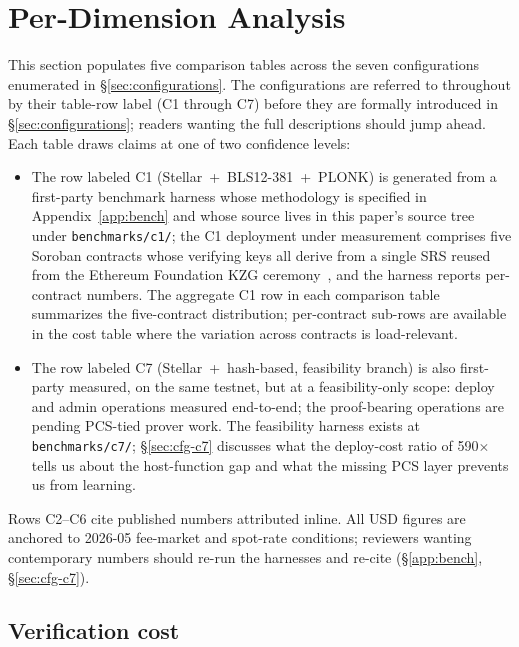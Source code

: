 \section{Per-Dimension Analysis}
\label{sec:analysis}

This section populates five comparison tables across the seven
configurations enumerated in \S\ref{sec:configurations}. The
configurations are referred to throughout by their table-row label
(C1 through C7) before they are formally introduced in
\S\ref{sec:configurations}; readers wanting the full descriptions
should jump ahead. Each table draws claims at one of two confidence
levels:

\begin{itemize}
  \item The row labeled C1 (Stellar~+~BLS12-381~+~PLONK) is
    generated from a first-party benchmark harness whose methodology
    is specified in Appendix~\ref{app:bench} and whose source lives
    in this paper's source tree under \texttt{benchmarks/c1/}; the
    C1 deployment under measurement comprises five Soroban contracts
    whose verifying keys all derive from a single SRS reused from
    the Ethereum Foundation KZG
    ceremony~\cite{eth-kzg-ceremony}, and the harness reports
    per-contract numbers. The aggregate C1 row in each comparison
    table summarizes the five-contract distribution; per-contract
    sub-rows are available in the cost table where the variation
    across contracts is load-relevant.
  \item The row labeled C7 (Stellar~+~hash-based, feasibility branch)
    is also first-party measured, on the same testnet, but at a
    feasibility-only scope: deploy and admin operations measured
    end-to-end; the proof-bearing operations are pending PCS-tied
    prover work. The feasibility harness exists at
    \texttt{benchmarks/c7/}; \S\ref{sec:cfg-c7} discusses what the
    deploy-cost ratio of 590$\times$ tells us about the
    host-function gap and what the missing PCS layer prevents us
    from learning.
\end{itemize}

Rows C2--C6 cite published numbers attributed inline. All USD
figures are anchored to 2026-05 fee-market and spot-rate conditions;
reviewers wanting contemporary numbers should re-run the harnesses
and re-cite (\S\ref{app:bench}, \S\ref{sec:cfg-c7}).

\subsection{Verification cost}
\label{sec:analysis-cost}

